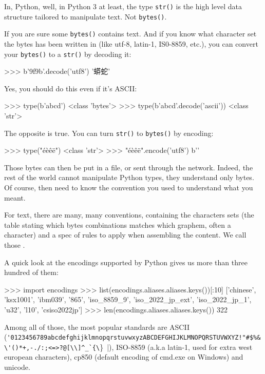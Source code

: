In, Python, well, in Python 3 at least, the type \lstinline{str()} is the high level data structure tailored to manipulate text. Not \lstinline{bytes()}.

If you are sure some \lstinline{bytes()} contains text. And if you know what character set the bytes has been written in (like utf-8, latin-1, IS0-8859, etc.), you can convert your \lstinline{bytes()} to a \lstinline{str()} by decoding it:

\begin{py3}
>>> b'\x9f\x9b'.decode('utf8')
'蟒蛇'
\end{py3}

Yes, you should do this even if it's ASCII:

\begin{py3}
>>> type(b'abcd')
<class 'bytes'>
>>> type(b'abcd'.decode('ascii'))
<class 'str'>
\end{py3}

The opposite is true. You can turn \lstinline{str()} to \lstinline{bytes()} by encoding:

\begin{py3}
>>> type("éèêë")
<class 'str'>
>>> "éèêë".encode('utf8')
b'\xaa{}\xab'
\end{py3}

Those bytes can then be put in a file, or sent through the network. Indeed, the rest of the world cannot manipulate Python types, they understand only bytes. Of course, then need to know the convention you used to understand what you meant.

For text, there are many, many conventions, containing the characters sets (the table stating which bytes combinations matches which graphem, often a character) and a spec of rules to apply when assembling the content. We call those .

A quick look at the encodings supported by Python gives us more than three hundred of them:

\begin{py3}
>>> import encodings
>>> list(encodings.aliases.aliases.keys())[:10]
['chinese', 'ksx1001', 'ibm039', '865', 'iso_8859_9', 'iso_2022_jp_ext', 'iso_2022_jp_1', 'u32', 'l10', 'csiso2022jp']
>>> len(encodings.aliases.aliases.keys())
322
\end{py3}

Among all of those, the most popular standards are ASCII (\lstinline|'0123456789abcdefghijklmnopqrstuvwxyzABCDEFGHIJKLMNOPQRSTUVWXYZ!"#$%&\'()*+,-./:;<=>?@[\\]^_`{\|\}~|), ISO-8859 (a.k.a latin-1, used for extra west european characters), cp850 (default encoding of cmd.exe on Windows) and unicode.

